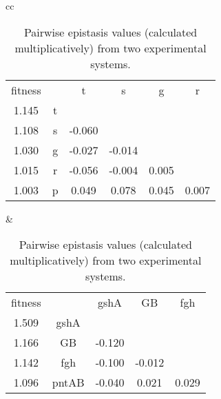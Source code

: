 \begin{table}
\newcommand{\hlB}{\cellcolor{blue!20}}
\newcommand{\hlR}{\cellcolor{red!20}}
\centering
\begin{tabular}{cc}
\begin{subtable}[b]{0.5\textwidth}
\caption{\citet{Khan2011}}
\begin{tabular}{cccccc}
fitness &   & t           & s           & g           & r           \\
1.145   & t &             &             &             &             \\
1.108   & s & \hlB -0.060 &             &             &             \\
1.030   & g & \hlB -0.027 & \hlB -0.014 &             &             \\
1.015   & r & \hlB -0.056 & \hlB -0.004 & \hlR 0.005  &             \\
1.003   & p & \hlR  0.049 & \hlR  0.078 & \hlR 0.045  & \hlR 0.007  \\
\end{tabular}
\end{subtable}
&
\begin{subtable}[b]{0.5\textwidth}
\caption{\citet{Chou2011}}
\begin{tabular}{ccccc}
fitness &       & gshA        & GB          & fgh         \\
1.509   & gshA  &             &             &             \\
1.166   & GB    & \hlB -0.120 &             &             \\
1.142   & fgh   & \hlB -0.100 & \hlB -0.012 &             \\
1.096   & pntAB & \hlB -0.040 & \hlR  0.021 & \hlR 0.029  \\
\end{tabular}
\end{subtable}
\\
\end{tabular}
\caption{Pairwise epistasis values (calculated multiplicatively) from 
two experimental systems.}
\label{tab:pairwiseBeneEpi}
\end{table}


